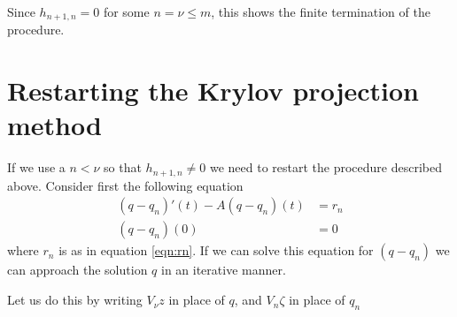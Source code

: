 Since $h_{n+1,n} = 0$ for some $n = \nu \leq m$, this shows the finite termination of the procedure.


\section{Restarting the Krylov projection method} \label{sec:rest}
If we use a $n < \nu$ so that $h_{n+1,n} \neq 0$ we need to restart the procedure described above. Consider first the following equation
\begin{equation}\label{eqn:restkry}
\begin{aligned}
 (q-q_n)'(t) -A (q-q_n)(t) &= r_n \\
(q-q_n)(0)& = 0
\end{aligned}
\end{equation}
where $r_n$ is as in equation \eqref{eqn:rn}. If we can solve this equation for $(q-q_n)$ we can approach the solution $q$ in an iterative manner.

Let us do this by writing $V_\nu z$ in place of $q$, and $V_n \zeta $ in place of $q_n$

